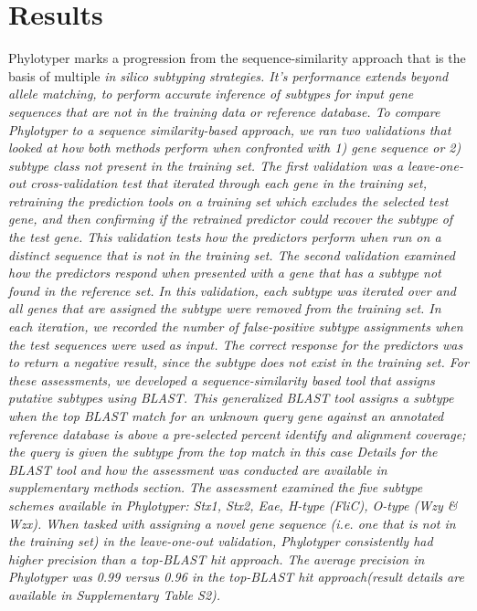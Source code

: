 \documentclass{bioinfo}
\begin{document}
\section{Results}

Phylotyper marks a progression from the sequence-similarity approach that is the basis of multiple \it{in silico} subtyping strategies.
It's performance extends beyond allele matching, to perform accurate inference of subtypes for input gene sequences that are not in the training data or reference database.
To compare Phylotyper to a sequence similarity-based approach, we ran two validations that looked at how both methods perform when confronted with 1) gene sequence or 2) subtype class not present in the training set.
The first validation was a leave-one-out cross-validation test that iterated through each gene in the training set, retraining the prediction tools on a training set which excludes the selected test gene, and then confirming if the retrained predictor could recover the subtype of the test gene.
This validation tests how the predictors perform when run on a distinct sequence that is not in the training set.
The second validation examined how the predictors respond when presented with a gene that has a subtype not found in the reference set.
In this validation, each subtype was iterated over and all genes that are assigned the subtype were removed from the training set.
In each iteration, we recorded the number of false-positive subtype assignments when the test sequences were used as input.
The correct response for the predictors was to return a negative result, since the subtype does not exist in the training set.
For these assessments, we developed a sequence-similarity based tool that assigns putative subtypes using BLAST.
This generalized BLAST tool assigns a subtype when the top BLAST match for an unknown query gene against an annotated reference database is above a pre-selected percent identify and alignment coverage; the query is given the subtype from the top match in this case
Details for the BLAST tool and how the assessment was conducted are available in supplementary methods section.
The assessment examined the five subtype schemes available in Phylotyper: Stx1, Stx2, Eae, H-type (FliC), O-type (Wzy \& Wzx).
When tasked with assigning a novel gene sequence (i.e. one that is not in the training set) in the leave-one-out validation, Phylotyper consistently had higher precision than a top-BLAST hit approach.
The average precision in Phylotyper was 0.99 versus 0.96 in the top-BLAST hit approach(result details are available in Supplementary Table S2).
\end{document}
